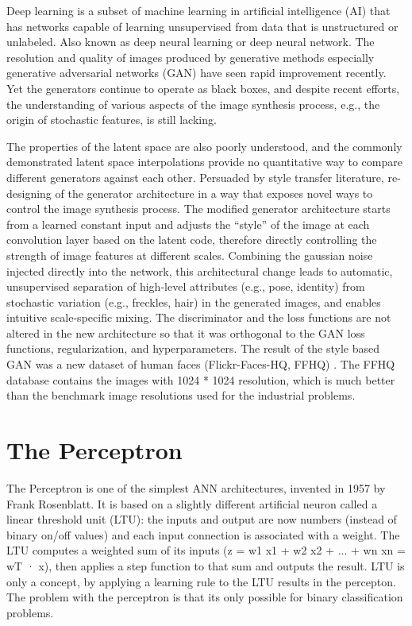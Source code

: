      Deep learning is a subset of machine learning in artificial intelligence (AI) that has networks capable of learning unsupervised from data that is unstructured or unlabeled. Also known as deep neural learning or deep neural network. The resolution and quality of images produced by generative methods especially generative adversarial networks (GAN) have seen rapid improvement recently. Yet the generators continue to operate as black boxes, and despite recent efforts, the understanding of various aspects of the image synthesis process, e.g., the origin of stochastic features, is still lacking. 
\par
    The properties of the latent space are also poorly understood, and the commonly demonstrated latent space interpolations provide no quantitative way to compare different generators against each other. Persuaded by style transfer literature, re-designing of the generator architecture in a way that exposes novel ways to control the image synthesis process. The modified generator architecture starts from a learned constant input and adjusts the “style” of the image at each convolution layer based on the latent code, therefore directly controlling the strength of image features at different scales. Combining the gaussian noise  injected directly into the network, this architectural change leads to automatic, unsupervised separation of high-level attributes (e.g., pose, identity) from stochastic variation (e.g., freckles, hair) in the generated images, and enables intuitive scale-specific mixing. The discriminator and the loss functions are not altered in the new architecture so that it  was orthogonal to the GAN loss functions, regularization, and hyperparameters. The result of the style based GAN was a new dataset of human faces (Flickr-Faces-HQ, FFHQ) . The FFHQ database contains the images with 1024 * 1024 resolution, which is much better than the benchmark image resolutions used for the industrial problems. 



\section{The Perceptron}
    The Perceptron is one of the simplest ANN architectures, invented in 1957 by Frank Rosenblatt. It is based on a slightly different artificial neuron called a linear threshold unit (LTU): the inputs and output are now numbers (instead of binary on/off values) and each input connection is associated with a weight. The LTU computes a weighted sum of its inputs (z = w1 x1 + w2 x2 + ... + wn xn = wT · x), then applies a step function to that sum and outputs the result. LTU is only a concept, by applying a learning rule to the LTU results in the percepton. The problem with the perceptron is that its only possible for binary classification problems.
    
